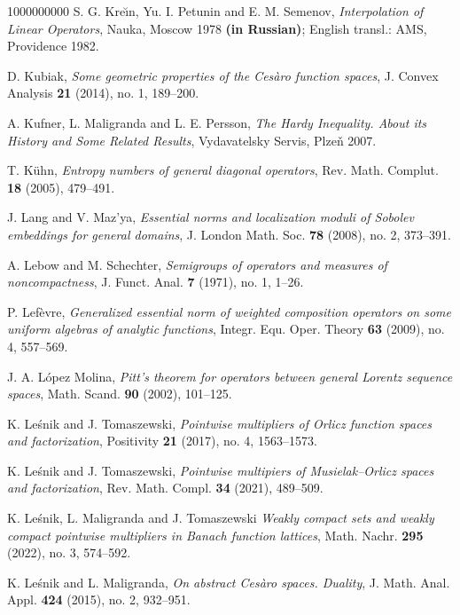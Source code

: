 \documentclass[11pt]{amsart}
\theoremstyle{definition}
\theoremstyle{definition}
\theoremstyle{definition}
\theoremstyle{definition}
\theoremstyle{definition}
\theoremstyle{definition}
\theoremstyle{definition}
\theoremstyle{definition}
\numberwithin{equation}{section}
\numberwithin{equation}{section}
\numberwithin{equation}{section}
\theoremstyle{definition}
\theoremstyle{definition}
\theoremstyle{definition}
\theoremstyle{definition}
\theoremstyle{definition}
\theoremstyle{definition}
\begin{document}
\begin{thebibliography}{1000000000}
	 S. G. Kre{\u \i}n, Yu. I. Petunin and E. M. Semenov, {\it Interpolation of Linear Operators}, Nauka, Moscow 1978 {\bf (in Russian)};
		English transl.: AMS, Providence 1982.
		
	 D. Kubiak, {\it Some geometric properties of the Ces{\` a}ro function spaces}, J. Convex Analysis {\bf 21} (2014), no. 1, 189--200.
	
	 A. Kufner, L. Maligranda and L. E. Persson, {\it The Hardy Inequality. About its History and Some Related Results},
		Vydavatelsky Servis, Plze\v n 2007.
		
	 T. K{\" u}hn, {\it Entropy numbers of general diagonal operators}, Rev. Math. Complut. {\bf 18} (2005), 479--491.
		
	 J. Lang and V. Maz'ya, {\it Essential norms and localization moduli of Sobolev embeddings for general domains}, J. London Math. Soc. {\bf 78} (2008),
	no. 2, 373--391.
		
	 A. Lebow and M. Schechter, {\it Semigroups of operators and measures of noncompactness}, J. Funct. Anal. {\bf 7} (1971), no. 1, 1--26.
	
	 P. Lef{\` e}vre, {\it Generalized essential norm of weighted composition operators on some uniform algebras of analytic functions},
		Integr. Equ. Oper. Theory {\bf 63} (2009), no. 4, 557--569.
		
	 J. A. L{\' o}pez Molina, {\it Pitt's theorem for operators between general Lorentz sequence spaces}, Math. Scand. {\bf 90} (2002), 101--125.
		
	 K. Le{\' s}nik and J. Tomaszewski, {\it Pointwise multipliers of Orlicz function spaces and factorization}, Positivity {\bf 21} (2017), no. 4, 1563--1573.
	
	 K. Le{\' s}nik and J. Tomaszewski, {\it Pointwise multipiers of Musielak--Orlicz spaces and factorization}, Rev. Math. Compl. {\bf 34} (2021), 489--509.
	
	 K. Le{\' s}nik, L. Maligranda and J. Tomaszewski {\it Weakly compact sets and weakly compact pointwise multipliers in Banach function lattices},
		Math. Nachr. {\bf 295} (2022), no. 3, 574--592.
		
	 K. Le{\'s}nik and L. Maligranda, {\it On abstract Ces\`aro spaces. Duality}, J. Math. Anal. Appl. {\bf 424} (2015), no. 2, 932--951.
		

\end{thebibliography}
\end{document}
